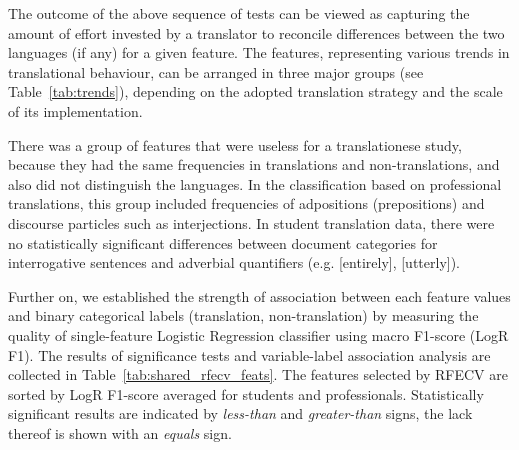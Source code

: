 The outcome of the above sequence of tests can be viewed as capturing the amount of effort invested by a translator to reconcile differences between the two languages (if any) for a given feature. The features, representing various trends in translational behaviour, can be arranged in three major groups (see Table~\ref{tab:trends}), depending on the adopted translation strategy and the scale of its implementation. 

There was a group of features that were useless for a translationese study, because they had the same frequencies in translations and non-translations, and also did not distinguish the languages. In the classification based on professional translations, this group included frequencies of adpositions (prepositions) and discourse particles such as interjections. In student translation data, there were no statistically significant differences between document categories for interrogative sentences and adverbial quantifiers (e.g.  [entirely],   [utterly]).

Further on, we established the strength of association between each feature values and binary categorical labels (translation, non-translation) by measuring the quality of single-feature Logistic Regression classifier using macro F1-score (LogR F1). The results of significance tests and variable-label association analysis are collected in Table~\ref{tab:shared_rfecv_feats}. The features selected by RFECV are sorted by LogR F1-score averaged for students and professionals. Statistically significant results are indicated by \textit{less-than} and \textit{greater-than} signs, the lack thereof is shown with an \textit{equals} sign.

